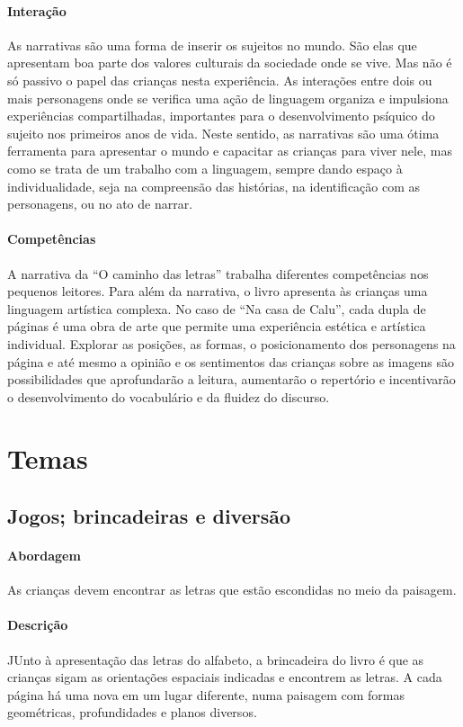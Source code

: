 \documentclass[11pt]{extarticle}
\begin{document}
\paragraph{Interação} 
As narrativas são uma forma de inserir os sujeitos no mundo. 
São elas que apresentam boa parte dos valores culturais da sociedade 
onde se vive. Mas não é só passivo o papel das crianças nesta experiência. 
As interações entre dois ou mais personagens onde se verifica
uma ação de linguagem organiza e impulsiona experiências compartilhadas,
importantes para o desenvolvimento psíquico do sujeito nos primeiros anos de vida.
Neste sentido, as narrativas são uma ótima ferramenta para
apresentar o mundo e capacitar as crianças para viver nele, mas como se
trata de um trabalho com a linguagem, sempre dando espaço à individualidade, 
seja na compreensão das histórias, na identificação com as personagens, ou 
no ato de narrar. 

\paragraph{Competências} 
A narrativa da ``O caminho das letras'' trabalha diferentes competências
nos pequenos leitores. Para além da narrativa, o livro
apresenta às crianças uma linguagem artística complexa. No caso de 
``Na casa de Calu'', cada dupla de páginas é uma obra de arte que permite 
uma experiência estética e artística individual. Explorar as posições, as formas, 
o posicionamento dos personagens na página e até mesmo a opinião e os sentimentos das crianças sobre as imagens 
são possibilidades que aprofundarão a leitura, aumentarão o repertório 
e incentivarão o desenvolvimento do vocabulário e da fluidez do discurso.  

\section{Temas}

\subsection{Jogos; brincadeiras e diversão}

\paragraph{Abordagem} 
As crianças devem encontrar as letras que estão escondidas
no meio da paisagem.
\paragraph{Descrição} 
JUnto à apresentação das letras do alfabeto, a brincadeira do livro
é que as crianças sigam as orientações espaciais indicadas e encontrem
as letras. A cada página há uma nova em um lugar diferente, numa
paisagem com formas geométricas, profundidades e planos diversos.
\end{document}

